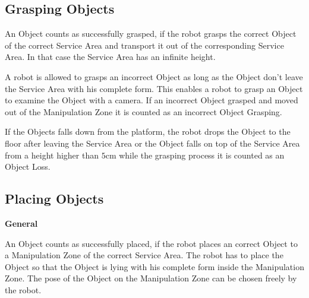 




\subsection{Grasping Objects} \label{ssec:GraspingObjects}

An Object counts as successfully grasped, if the robot grasps the correct Object of the correct Service Area and transport it out of the corresponding Service Area. In that case the Service Area has an infinite height.

A robot is allowed to grasps an incorrect Object as long as the Object don't leave the Service Area with his complete form. This enables a robot to grasp an Object to examine the Object with a camera. If an incorrect Object grasped and moved out of the Manipulation Zone it is counted as an incorrect Object Grasping.

If the Objects falls down from the platform, the robot drops the Object to the floor after leaving the Service Area or the Object falls on top of the Service Area from a height higher than $5\si{\centi\meter}$ while the grasping process it is counted as an Object Loss.


\subsection{Placing Objects} \label{ssec:PlacingObjects}

\textbf{General}

An Object counts as successfully placed, if the robot places an correct Object to a Manipulation Zone of the correct Service Area. The robot has to place the Object so that the Object is lying with his complete form inside the Manipulation Zone. The pose of the Object on the Manipulation Zone can be chosen freely by the robot.

